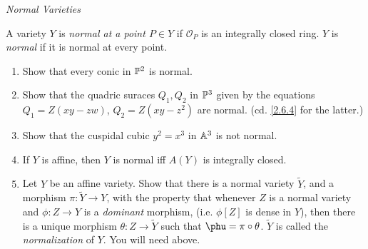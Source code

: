 \label{1.3.17}

\emph{Normal Varieties}

A variety $Y$ is \emph{normal at a point $P \in Y$} if $\mathcal O_P$ is an integrally closed ring. $Y$ is \emph{normal} if it is normal at every point.

\begin{enumerate}[label = (\alph*)]
    \item Show that every conic in $\P^2$ is normal.

    \item Show that the quadric suraces $Q_1, Q_2$ in $\P^3$ given by the equations $Q_1 = Z(xy - zw)$, $Q_2 = Z(xy - z^2)$ are normal. (cd. \ref{2.6.4} for the latter.)

    \item Show that the cuspidal cubic $y^2 = x^3$ in $\A^3$ is not normal.

    \item If $Y$ is affine, then $Y$ is normal iff $A(Y)$ is integrally closed.

    \item Let $Y$ be an affine variety. Show that there is a normal variety $\widetilde{Y}$, and a morphism $\pi: \widetilde{Y} \longrightarrow Y$, with the property that whenever $Z$ is a normal variety and $\phi: Z \longrightarrow Y$ is a \emph{dominant} morphism, (i.e. $\phi[Z]$ is dense in $Y$), then there is a unique morphism $\theta: Z \longrightarrow \widetilde{Y}$ such that $\phu = \pi \circ \theta$. $\widetilde{Y}$ is called the \emph{normalization} of $Y$. You will need \cite[I.3.9A]{hartshorne} above.
\end{enumerate}

